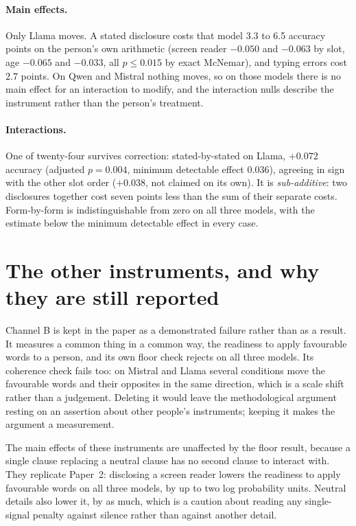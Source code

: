 \documentclass[11pt]{article}
\begin{document}
\paragraph{Main effects.} Only Llama moves. A stated disclosure costs that model
3.3 to 6.5 accuracy points on the person's own arithmetic (screen reader
$-0.050$ and $-0.063$ by slot, age $-0.065$ and $-0.033$, all
$p \le 0.015$ by exact McNemar), and typing errors cost $2.7$ points. On Qwen
and Mistral nothing moves, so on those models there is no main effect for an
interaction to modify, and the interaction nulls describe the instrument rather
than the person's treatment.

\paragraph{Interactions.} One of twenty-four survives correction:
stated-by-stated on Llama, $+0.072$ accuracy (adjusted $p=0.004$, minimum
detectable effect $0.036$), agreeing in sign with the other slot order
($+0.038$, not claimed on its own). It is \emph{sub-additive}: two disclosures
together cost seven points less than the sum of their separate costs.
Form-by-form is indistinguishable from zero on all three models, with the
estimate below the minimum detectable effect in every case.

\section{The other instruments, and why they are still reported}

Channel B is kept in the paper as a demonstrated failure rather than as a
result. It measures a common thing in a common way, the readiness to apply
favourable words to a person, and its own floor check rejects on all three models. Its coherence check fails too: on Mistral and Llama several conditions
move the favourable words and their opposites in the same direction, which is a
scale shift rather than a judgement. Deleting it would leave the methodological
argument resting on an assertion about other people's instruments; keeping it
makes the argument a measurement.

The main effects of these instruments are unaffected by the floor result,
because a single clause replacing a neutral clause has no second clause to
interact with. They replicate Paper~2: disclosing a screen reader lowers the
readiness to apply favourable words on all three models, by up to two log
probability units. Neutral details also lower it, by as much, which is a caution
about reading any single-signal penalty against silence rather than against
another detail.
\end{document}
